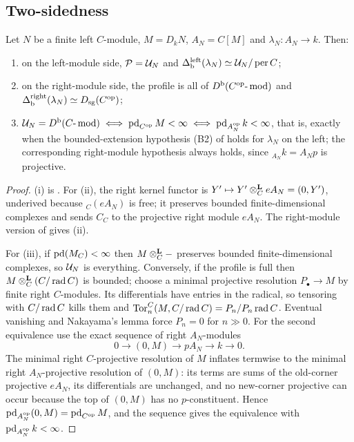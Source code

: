 \subsection{Two-sidedness}

\begin{theorem}\label{thm:two-sided}
Let \(N\) be a finite left \(C\)-module, \(M=D_kN\), \(A_N=C[M]\) and \(\lambda_N:A_N\to k\).  Then:
\begin{enumerate}[label=\textup{(\roman*)}]
\item on the left-module side, \(\mathcal P=\mathcal U_N\) and \(\Delta_{\mathrm b}^{\mathrm{left}}(\lambda_N)\simeq\mathcal U_N/\operatorname{per} C\);
\item on the right-module side, the profile is all of \(D^{\mathrm b}(C^{\mathrm{op}}\text{-}\operatorname{mod})\) and \(\Delta_{\mathrm b}^{\mathrm{right}}(\lambda_N)\simeq D_{\mathrm{sg}}(C^{\mathrm{op}})\);
\item \(\mathcal U_N=D^{\mathrm b}(C\text{-}\operatorname{mod})\iff\operatorname{pd}_{C^{\mathrm{op}}}M<\infty\iff\operatorname{pd}_{A_N^{\mathrm{op}}}k<\infty\), that is, exactly when the bounded-extension hypothesis \textup{(B2)} of  holds for \(\lambda_N\) on the left; the corresponding right-module hypothesis always holds, since \({}_{A_N}k=A_Np\) is projective.
\end{enumerate}
\end{theorem}

\begin{proof}
(i) is .  For (ii), the right kernel functor is \(Y'\mapsto Y'\otimes^{\mathbf L}_CeA_N=(0,Y')\), underived because \({}_C(eA_N)\) is free; it preserves bounded finite-dimensional complexes and sends \(C_C\) to the projective right module \(eA_N\).  The right-module version of  gives (ii).

For (iii), if \(\operatorname{pd}(M_C)<\infty\) then \(M\otimes^{\mathbf L}_C-\) preserves bounded finite-dimensional complexes, so \(\mathcal U_N\) is everything.  Conversely, if the profile is full then \(M\otimes^{\mathbf L}_C(C/\operatorname{rad} C)\) is bounded; choose a minimal projective resolution \(P_\bullet\to M\) by finite right \(C\)-modules.  Its differentials have entries in the radical, so tensoring with \(C/\operatorname{rad} C\) kills them and \(\operatorname{Tor}_n^C(M,C/\operatorname{rad} C)=P_n/P_n\operatorname{rad} C\).  Eventual vanishing and Nakayama's lemma force \(P_n=0\) for \(n\gg0\).  For the second equivalence use the exact sequence of right \(A_N\)-modules
\[
 0\longrightarrow(0,M)\longrightarrow pA_N\longrightarrow k\longrightarrow0 .
\]
The minimal right \(C\)-projective resolution of \(M\) inflates termwise to the minimal right \(A_N\)-projective resolution of \((0,M)\): its terms are sums of the old-corner projective \(eA_N\), its differentials are unchanged, and no new-corner projective can occur because the top of \((0,M)\) has no \(p\)-constituent.  Hence \(\operatorname{pd}_{A_N^{\mathrm{op}}}(0,M)=\operatorname{pd}_{C^{\mathrm{op}}}M\), and the sequence gives the equivalence with \(\operatorname{pd}_{A_N^{\mathrm{op}}}k<\infty\).
\end{proof}

